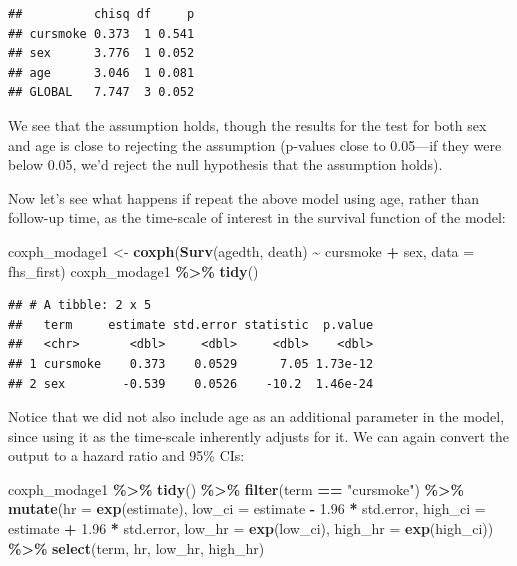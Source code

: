 \documentclass[
]{book}
\newenvironment{Shaded}{\begin{snugshade}}{\end{snugshade}}
\newcommand{\AttributeTok}[1]{\textcolor[rgb]{0.13,0.29,0.53}{#1}}
\newcommand{\FloatTok}[1]{\textcolor[rgb]{0.00,0.00,0.81}{#1}}
\newcommand{\FunctionTok}[1]{\textcolor[rgb]{0.13,0.29,0.53}{\textbf{#1}}}
\newcommand{\NormalTok}[1]{#1}
\newcommand{\OtherTok}[1]{\textcolor[rgb]{0.56,0.35,0.01}{#1}}
\newcommand{\SpecialCharTok}[1]{\textcolor[rgb]{0.81,0.36,0.00}{\textbf{#1}}}
\newcommand{\StringTok}[1]{\textcolor[rgb]{0.31,0.60,0.02}{#1}}
\begin{document}
\begin{verbatim}
##          chisq df     p
## cursmoke 0.373  1 0.541
## sex      3.776  1 0.052
## age      3.046  1 0.081
## GLOBAL   7.747  3 0.052
\end{verbatim}

We see that the assumption holds, though the results for the test for both sex and age is close to rejecting the assumption (p-values close to 0.05---if they were below 0.05, we'd reject the null hypothesis that the assumption holds).

Now let's see what happens if repeat the above model using age, rather than follow-up time, as the time-scale of interest in the survival function of the model:

\begin{Shaded}
\begin{Highlighting}[]
\NormalTok{coxph\_modage1 }\OtherTok{\textless{}{-}} \FunctionTok{coxph}\NormalTok{(}\FunctionTok{Surv}\NormalTok{(agedth, death) }\SpecialCharTok{\textasciitilde{}}\NormalTok{ cursmoke }\SpecialCharTok{+}\NormalTok{ sex, }\AttributeTok{data =}\NormalTok{ fhs\_first)}
\NormalTok{coxph\_modage1 }\SpecialCharTok{\%\textgreater{}\%}
  \FunctionTok{tidy}\NormalTok{()}
\end{Highlighting}
\end{Shaded}

\begin{verbatim}
## # A tibble: 2 x 5
##   term     estimate std.error statistic  p.value
##   <chr>       <dbl>     <dbl>     <dbl>    <dbl>
## 1 cursmoke    0.373    0.0529      7.05 1.73e-12
## 2 sex        -0.539    0.0526    -10.2  1.46e-24
\end{verbatim}

Notice that we did not also include age as an additional parameter in the model, since using it as the time-scale inherently adjusts for it. We can again convert the output to a hazard ratio and 95\% CIs:

\begin{Shaded}
\begin{Highlighting}[]
\NormalTok{coxph\_modage1 }\SpecialCharTok{\%\textgreater{}\%} 
  \FunctionTok{tidy}\NormalTok{() }\SpecialCharTok{\%\textgreater{}\%} 
  \FunctionTok{filter}\NormalTok{(term }\SpecialCharTok{==} \StringTok{"cursmoke"}\NormalTok{) }\SpecialCharTok{\%\textgreater{}\%} 
  \FunctionTok{mutate}\NormalTok{(}\AttributeTok{hr =} \FunctionTok{exp}\NormalTok{(estimate),}
         \AttributeTok{low\_ci =}\NormalTok{ estimate }\SpecialCharTok{{-}} \FloatTok{1.96} \SpecialCharTok{*}\NormalTok{ std.error, }
         \AttributeTok{high\_ci =}\NormalTok{ estimate }\SpecialCharTok{+} \FloatTok{1.96} \SpecialCharTok{*}\NormalTok{ std.error, }
         \AttributeTok{low\_hr =} \FunctionTok{exp}\NormalTok{(low\_ci), }
         \AttributeTok{high\_hr =} \FunctionTok{exp}\NormalTok{(high\_ci)) }\SpecialCharTok{\%\textgreater{}\%} 
  \FunctionTok{select}\NormalTok{(term, hr, low\_hr, high\_hr)}
\end{Highlighting}
\end{Shaded}
\end{document}
